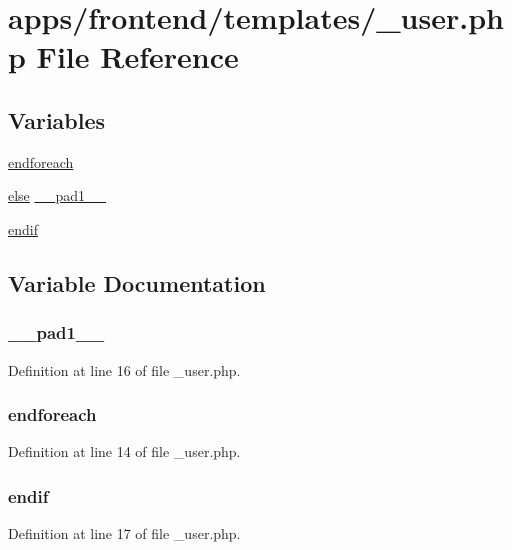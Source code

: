 \hypertarget{__user_8php}{\section{apps/frontend/templates/\-\_\-user.php File Reference}
\label{__user_8php}
}
\subsection*{Variables}
\begin{DoxyCompactItemize}
\item 
\hyperlink{__user_8php_a672d9707ef91db026c210f98cc601123}{endforeach}
\item 
\hyperlink{live_2modules_2team_2templates_2management_success_8php_a0544c3fe466e421738dae463968b70ba}{else} \hyperlink{__user_8php_ae8b4bb1441c6ab4dcb28a37bc46c8ead}{\-\_\-\-\_\-pad1\-\_\-\-\_\-}
\item 
\hyperlink{__user_8php_a82cd33ca97ff99f2fcc5e9c81d65251b}{endif}
\end{DoxyCompactItemize}


\subsection{Variable Documentation}
\hypertarget{__user_8php_ae8b4bb1441c6ab4dcb28a37bc46c8ead}{
\subsubsection[{\-\_\-\-\_\-pad1\-\_\-\-\_\-}]{ \-\_\-\-\_\-pad1\-\_\-\-\_\-}}\label{__user_8php_ae8b4bb1441c6ab4dcb28a37bc46c8ead}


Definition at line 16 of file \-\_\-user.\-php.

\hypertarget{__user_8php_a672d9707ef91db026c210f98cc601123}{
\subsubsection[{endforeach}]{\setlength{\rightskip}{0pt plus 5cm}endforeach}}\label{__user_8php_a672d9707ef91db026c210f98cc601123}


Definition at line 14 of file \-\_\-user.\-php.

\hypertarget{__user_8php_a82cd33ca97ff99f2fcc5e9c81d65251b}{
\subsubsection[{endif}]{\setlength{\rightskip}{0pt plus 5cm}endif}}\label{__user_8php_a82cd33ca97ff99f2fcc5e9c81d65251b}


Definition at line 17 of file \-\_\-user.\-php.

